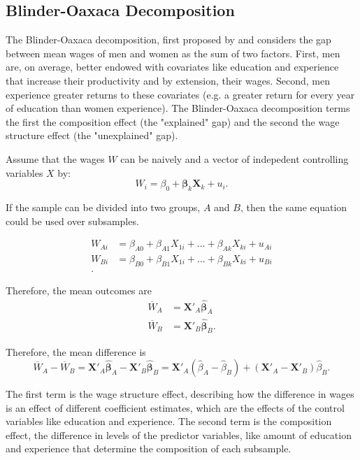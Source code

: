 \documentclass[12pt]{article}
\begin{document}
\subsection{Blinder-Oaxaca Decomposition
\label{subsec:BOdecomp}}
The Blinder-Oaxaca decomposition, first proposed by \citet{Blinder1973} and \citet{Oaxaca1973} considers the gap between mean wages of men and women as the sum of two factors. First, men are, on average, better endowed with covariates like education and experience that increase their productivity and by extension, their wages. Second, men experience greater returns to these covariates (e.g. a greater return for every year of education than women experience). The Blinder-Oaxaca decomposition terms the first the composition effect (the "explained" gap) and the second the wage structure effect (the "unexplained" gap).

Assume that the wages $W$ can be naively and a vector of indepedent controlling variables $X$ by:
\begin{equation}
	W_i = \beta_0 + \mathbf{\beta}_k \mathbf{X}_k + u_i 
.\end{equation}

If the sample can be divided into two groups, $A$ and $B$, then the same equation could be used over subsamples.

\begin{align*}
	W_{Ai} &= \beta_{A0} + \beta_{A1}X_{1i} + \ldots +  \beta_{Ak}X_{ki} + u_{Ai} \\
	W_{Bi} &= \beta_{B0} + \beta_{B1}X_{1i} + \ldots + \beta_{Bk}X_{ki} + u_{Bi} \\
.\end{align*}

Therefore, the mean outcomes are
\begin{align*}
	\overline{W}_A &= \mathbf{X'}_{A} \mathbf{\hat{\beta}}_{A} \\
	\overline{W}_B &= \mathbf{X'}_{B} \mathbf{\hat{\beta}}_{B}
.\end{align*}

Therefore, the mean difference is
\begin{equation}
	\overline{W}_A - \overline{W}_B = \mathbf{X'}_{A} \mathbf{\hat{\beta}}_{A} - \mathbf{X'}_{B} \mathbf{\hat{\beta}}_{B} = \mathbf{X'}_{A}\left(\hat{\beta}_A - \hat{\beta}_B  \right) + \left(\mathbf{X'}_A - \mathbf{X'}_B  \right)  \hat{\beta}_B
.\end{equation}

The first term is the wage structure effect, describing how the difference in wages is an effect of different coefficient estimates, which are the effects of the control variables like education and experience. The second term is the composition effect, the difference in levels of the predictor variables, like amount of education and experience that determine the composition of each subsample.
\end{document}
